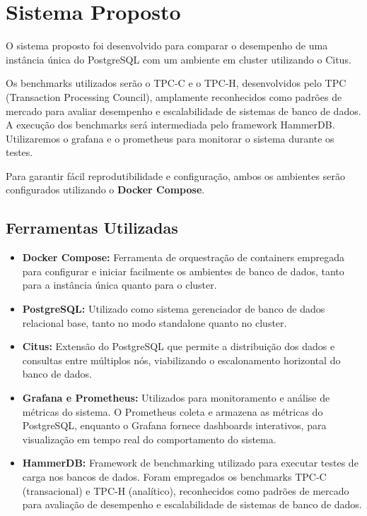 \section{Sistema Proposto}

O sistema proposto foi desenvolvido para comparar o desempenho de uma instância única do PostgreSQL 
com um ambiente em cluster utilizando o Citus.

Os benchmarks utilizados serão o TPC-C e o TPC-H, desenvolvidos pelo TPC (Transaction Processing Council),
amplamente reconhecidos como padrões de mercado para avaliar desempenho e escalabilidade de sistemas 
de banco de dados. A execução dos benchmarks será intermediada pelo framework HammerDB.
Utilizaremos o grafana e o prometheus para monitorar o sistema durante os testes.

Para garantir fácil reprodutibilidade e configuração, 
ambos os ambientes serão configurados utilizando o \textbf{Docker Compose}.

\subsection{Ferramentas Utilizadas}
\begin{itemize}
    \item \textbf{Docker Compose:} 
	Ferramenta de orquestração de containers empregada para configurar e iniciar facilmente os ambientes de banco de dados, 
	tanto para a instância única quanto para o cluster.
	
	\item \textbf{PostgreSQL:} 
	Utilizado como sistema gerenciador de banco de dados relacional base,
	tanto no modo standalone quanto no cluster.
    
    \item \textbf{Citus:} 
	Extensão do PostgreSQL que permite a distribuição dos dados e consultas entre múltiplos nós,
	viabilizando o escalonamento horizontal do banco de dados.
    
    \item \textbf{Grafana e Prometheus:} 
	Utilizados para monitoramento e análise de métricas do sistema. 
	O Prometheus coleta e armazena as métricas do PostgreSQL, enquanto o Grafana fornece dashboards interativos,
	para visualização em tempo real do comportamento do sistema.
    
    \item \textbf{HammerDB:}
	Framework de benchmarking utilizado para executar testes de carga nos bancos de dados.
	Foram empregados os benchmarks TPC-C (transacional) e TPC-H (analítico), 
	reconhecidos como padrões de mercado para avaliação de desempenho e escalabilidade de sistemas de banco de dados.
\end{itemize}

